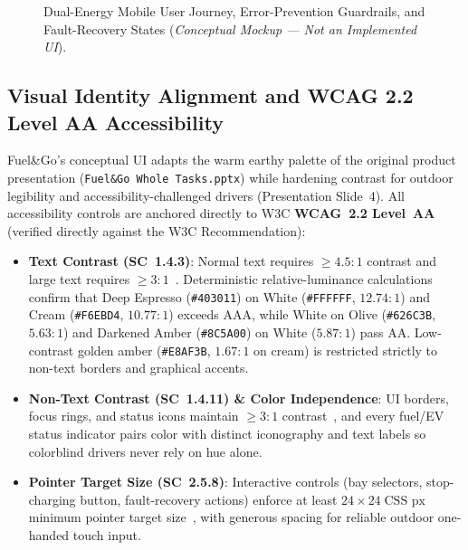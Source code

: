 \begin{figure}[!htbp]
  \centering
  
  \caption{Dual-Energy Mobile User Journey, Error-Prevention Guardrails, and Fault-Recovery States (\emph{Conceptual Mockup --- Not an Implemented UI}).}
  \label{fig:ux-journey}
\end{figure}

\subsection{Visual Identity Alignment and WCAG 2.2 Level AA Accessibility}
\label{sec:ux-accessibility}

Fuel\&Go's conceptual UI adapts the warm earthy palette of the original product presentation (\texttt{Fuel\&Go Whole Tasks.pptx}) while hardening contrast for outdoor legibility and accessibility-challenged drivers (Presentation Slide~4). All accessibility controls are anchored directly to W3C \textbf{WCAG~2.2 Level~AA}~\cite{w3c2023wcag22} (verified directly against the W3C Recommendation):

\begin{itemize}[leftmargin=1.4em, itemsep=2pt]
  \item \textbf{Text Contrast (SC~1.4.3)}: Normal text requires $\ge 4.5{:}1$ contrast and large text requires $\ge 3{:}1$~\cite{w3c2023wcag22}. Deterministic relative-luminance calculations confirm that Deep Espresso (\texttt{\#403011}) on White (\texttt{\#FFFFFF}, $12.74{:}1$) and Cream (\texttt{\#F6EBD4}, $10.77{:}1$) exceeds AAA, while White on Olive (\texttt{\#626C3B}, $5.63{:}1$) and Darkened Amber (\texttt{\#8C5A00}) on White ($5.87{:}1$) pass AA. Low-contrast golden amber (\texttt{\#E8AF3B}, $1.67{:}1$ on cream) is restricted strictly to non-text borders and graphical accents.
  \item \textbf{Non-Text Contrast (SC~1.4.11) \& Color Independence}: UI borders, focus rings, and status icons maintain $\ge 3{:}1$ contrast~\cite{w3c2023wcag22}, and every fuel/EV status indicator pairs color with distinct iconography and text labels so colorblind drivers never rely on hue alone.
  \item \textbf{Pointer Target Size (SC~2.5.8)}: Interactive controls (bay selectors, stop-charging button, fault-recovery actions) enforce at least $24 \times 24\;\text{CSS~px}$ minimum pointer target size~\cite{w3c2023wcag22}, with generous spacing for reliable outdoor one-handed touch input.
\end{itemize}

